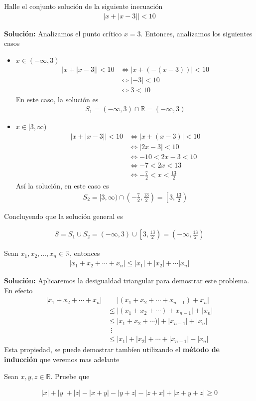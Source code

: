 \documentclass[12pt]{book}
\begin{document}
\begin{prob}{}{}
    Halle el conjunto solución de la siguiente inecuación 
\begin{align*}
    |x+|x-3|| <10 
\end{align*}
\end{prob}
\textbf{Solución:} Analizamos el punto crítico $x=3$. Entonces, analizamos los siguientes casos 
\begin{itemize}
    \item $x \in (-\infty,3)$
    \begin{align*}
         |x+|x-3|| <10 &\Longleftrightarrow |x+(-(x-3))|<10 \\
          &\Longleftrightarrow |-3| <10 \\
           &\Longleftrightarrow  3 <10
    \end{align*}
    En este caso, la solución es 
    \begin{align*}
        S_1 = (-\infty,3)\cap \mathbb{R}=(-\infty,3)
    \end{align*}
    \item  $x \in [3,\infty)$
\begin{align*}
     |x+|x-3|| <10 &\Longleftrightarrow |x+(x-3)| <10 \\
     &\Longleftrightarrow |2x-3| < 10 \\
     &\Longleftrightarrow -10 < 2x-3< 10 \\
     &\Longleftrightarrow -7 < 2 x <13 \\
     &\Longleftrightarrow -\frac{7}{2}<x <\frac{13}{2}
\end{align*}
Así la solución, en este caso es 
\begin{align*}
    S_2= [3,\infty) \cap \left(-\frac{7}{2},\frac{13}{2}\right)=\left[3, \frac{13}{2}\right)
\end{align*}
\end{itemize}
Concluyendo que la solución general es 

\begin{align*}
    S=S_1 \cup S_2 = (-\infty,3) \cup \left[3, \frac{13}{2}\right)= \left(-\infty, \frac{13}{2}\right)
\end{align*}
\begin{prob}{}{}
      Sean $x_1,x_2, \ldots, x_n \in \mathbb{R}$, entonces 
\begin{align*}
|x_1+x_2+\cdots+x_n| \leq |x_1|+|x_2|+\cdots |x_n|
\end{align*}
\end{prob}
\textbf{Solución:}
Aplicaremos la desigualdad triangular para demostrar este problema. En efecto
\begin{align*}
    |x_1+x_2+\cdots+x_n|&=|(x_1+x_2+\cdots+x_{n-1})+x_n| \\
    &\leq |(x_1+x_2+\cdots)+x_{n-1}|+ |x_n | \\
    &\leq |x_1 +x_2+\cdots)|+|x_{n-1}|+|x_n| \\
    & \ \ \vdots \\
    &\leq |x_1|+|x_2|+\cdots + |x_{n-1}| +|x_n| 
\end{align*}
Esta propiedad, se puede demostrar tambíen utilizando el \textbf{método de inducción} que veremos mas adelante

\begin{prob}{}{}
Sean $x,y,z \in \mathbb{R}$. Pruebe que 

\begin{align*}
    |x|+|y|+|z|-|x+y|-|y+z|-|z+x|+|x+y+z| \geq 0
\end{align*}
    
\end{prob}
\end{document}
